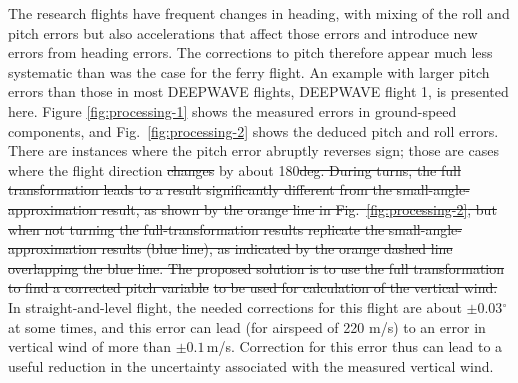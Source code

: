 \documentclass[12pt,twoside,english]{article}\usepackage[]{graphicx}\usepackage[]{color}
\let\OrgIndex\index
\renewcommand*{\index}[1]{\OrgIndex{#1}}
\providecommand{\DIFadd}[1]{{\protect\color{blue}\uwave{#1}}} %
\providecommand{\DIFdel}[1]{{\protect\color{red}\sout{#1}}}                      %
\providecommand{\DIFaddbegin}{} %
\providecommand{\DIFaddend}{} %
\providecommand{\DIFdelbegin}{} %
\providecommand{\DIFdelend}{} %
\begin{document}
{{The research flights have frequent changes in heading, with mixing of the roll and pitch errors but also accelerations that affect those errors and introduce new errors from heading errors. The corrections to pitch therefore appear much less systematic than was the case for the ferry flight. An example with larger pitch errors than those in most DEEPWAVE flights, DEEPWAVE flight 1, is presented here. Figure \ref{fig:processing-1} shows the measured errors in ground-speed components, and Fig.~\ref{fig:processing-2} shows the deduced pitch and roll errors. There are instances where the pitch error abruptly reverses sign; those are cases where the flight direction \DIFdelbegin \DIFdel{changes }\DIFdelend \DIFaddbegin \DIFadd{changed }\DIFaddend by about 180\DIFdelbegin \DIFdel{deg. 
During turns, the full transformation leads to a result significantly different from the small-angle-approximation result, as shown by the orange line in Fig.~\ref{fig:processing-2}, but when not turning the full-transformation results replicate the small-angle-approximation results (blue line), as indicated by the orange dashed line overlapping the blue line. The proposed solution is to use the full transformation to find a corrected pitch variable}%
\DIFdel{to be used for calculation of the vertical wind. }\DIFdelend \DIFaddbegin \DIFadd{$^{\circ}$. 
}\DIFaddend In straight-and-level flight, the needed corrections for this flight are about $\pm$0.03$^{\circ}$ at some times, and this error can lead (for airspeed of 220 m/s) to an error in vertical wind of more than $\pm0.1$\,m/s. Correction for this error thus can lead to a useful reduction in the uncertainty associated with the measured vertical wind. 

}}
\end{document}
